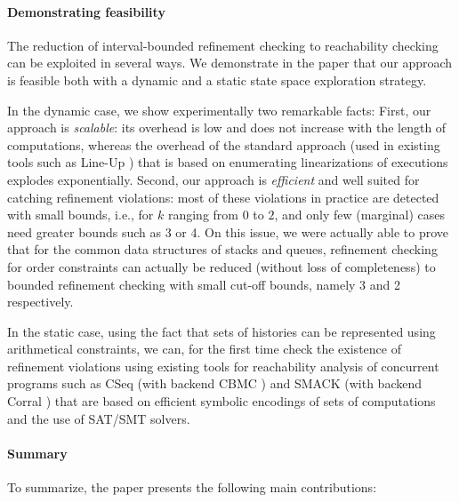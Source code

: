 \paragraph{Demonstrating feasibility}

The reduction of interval-bounded refinement checking to reachability checking
can be exploited in several ways. We demonstrate in the paper that our approach
is feasible both with a dynamic and a static state space exploration strategy.

In the dynamic case, we show experimentally two remarkable facts: First, our
approach is \emph{scalable}: its overhead is low and does not increase with the
length of computations, whereas the overhead of the standard approach (used in
existing tools such as Line-Up \cite{}) that is based on enumerating
linearizations of executions explodes exponentially. Second, our approach is
\emph{efficient} and well suited for catching refinement violations: most of
these violations in practice are detected with small bounds, i.e., for $k$
ranging from 0 to $2$, and only few (marginal) cases need greater bounds such
as 3 or 4. On this issue, we were actually able to prove that for the common
data structures of stacks and queues, refinement checking for order constraints
can actually be reduced (without loss of completeness) to bounded refinement
checking with small cut-off bounds, namely 3 and 2 respectively.

In the static case, using the fact that sets of histories can be represented
using arithmetical constraints, we can, for the first time check the existence
of refinement violations using existing tools for reachability analysis of
concurrent programs such as CSeq \cite{} (with backend CBMC \cite{}) and SMACK
\cite{} (with backend Corral \cite{}) that are based on efficient symbolic
encodings of sets of computations and the use of SAT/SMT solvers.

\paragraph{Summary}

To summarize, the paper presents the following main contributions:

